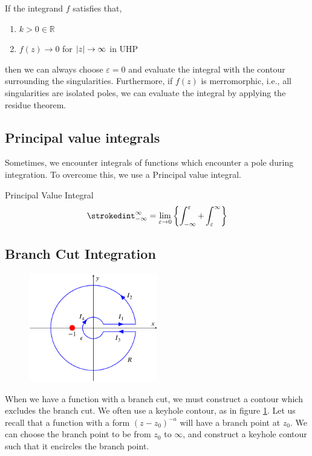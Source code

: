 \documentclass{book}
\begin{document}
If the integrand $f$ satisfies that,
\begin{enumerate}
	\item $k > 0 \in \mathbb{R}$
	\item $f(z) \to 0$ for $\abs{z} \to \infty$ in UHP
\end{enumerate}
then we can always choose $\varepsilon = 0$ and evaluate the integral with the contour surrounding the singularities. Furthermore, if $f(z)$ is merromorphic, i.e., all singularities are isolated poles, we can evaluate the integral by applying the residue theorem. 
\subsection{Principal value integrals}
Sometimes, we encounter integrals of functions which encounter a pole during integration. To overcome this, we use a Principal value integral.
\begin{Definitions}{Principal Value Integral}{}
	\begin{equation}
	\strokedint_{-\infty}^{\infty} = \lim_{\varepsilon\to0} \left\{\int_{-\infty}^{\varepsilon} + \int_{\varepsilon}^{\infty}\right\}
\end{equation}
\end{Definitions}
\subsection{Branch Cut Integration}
\begin{figure}
	\centering
	\includegraphics[width=0.5\textwidth]{keyhole.png}
	\caption{}
	\label{fig:keyhole}
\end{figure}
When we have a function with a branch cut, we must construct a contour which excludes the branch cut. We often use a keyhole contour, as in figure \ref{fig:keyhole}. Let us recall that a function with a form $(z - z_0)^{-a}$ will have a branch point at $z_0$. We can choose the branch point to be from $z_0$ to $\infty$, and construct a keyhole contour such that it encircles the branch point.
\end{document}
